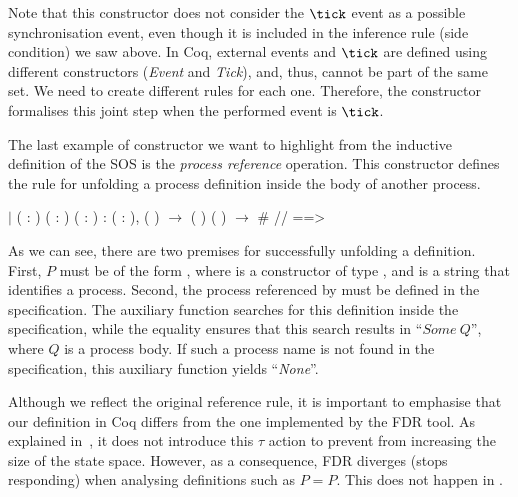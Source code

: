 Note that this constructor does not consider the $ \tick $ event as a possible synchronisation event, even though it is included in the inference rule (side condition) we saw above. In Coq, external events and $\tick$ are defined using different constructors (\emph{Event} and \emph{Tick}), and, thus, cannot be part of the same set. We need to create different rules for each one. Therefore, the constructor  formalises this joint step when the performed event is $\tick$.

The last example of constructor we want to highlight from the inductive definition of the SOS is the \emph{process reference} operation. This constructor defines the rule for unfolding a process definition inside the body of another process.

\begin{coqdoccode}
	\coqdocnoindent
	\ensuremath{|}  ( : ) ( : ) ( : ) :\coqdoceol
	\coqdocindent{1.00em}
	\coqdockw{\ensuremath{\forall}} ( : ),\coqdoceol
	\coqdocindent{3.00em}
	  ( ) \ensuremath{\rightarrow}\coqdoceol
	\coqdocindent{3.00em}
	 (  ) ( ) \ensuremath{\rightarrow}\coqdoceol
	\coqdocindent{3.00em}
	 \#  //  ==> \coqdoceol
\end{coqdoccode}

As we can see, there are two premises for successfully unfolding a definition. First, $P$ must be of the form  , where  is a constructor of type , and  is a string that identifies a process. Second, the process referenced by   must be defined in the specification. The auxiliary function  searches for this definition inside the specification, while the equality ensures that this search results in ``$ Some \ Q $'', where $ Q $ is a process body. If such a process name is not found in the specification, this auxiliary function yields ``\emph{None}''.

Although we reflect the original reference rule, it is important to emphasise that our definition in Coq differs from the one implemented by the FDR tool. As explained in~, it does not introduce this $\tau$ action to prevent from increasing the size of the state space. However, as a consequence, FDR diverges (stops responding) when analysing definitions such as $P = P$. This does not happen in \CSPcoq{}.

